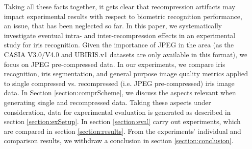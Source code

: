 \documentclass[10pt,twocolumn,letterpaper]{article}
\begin{document}
	Taking all these facts together, it gets clear that recompression artifacts may impact experimental results with respect to biometric recognition
	performance, an issue, that has been neglected so far. In this paper, we systematically investigate eventual intra- and inter-recompression effects 
	in an experimental study
	for iris recognition. Given the importance of JPEG in the area (as the CASIA V3.0/V4.0 and UBIRIS.v1 datasets are only available in this format), we 
	focus on JPEG pre-compressed data. In our experiments, we compare iris recognition, iris segmentation, and general purpose image quality metrics applied
	to single compressed vs. recompressed (i.e. JPEG pre-compressed) iris image data. In Section \ref{section:comprScheme}, we discuss the aspects relevant when generating single and recompressed data. Taking these aspects under consideration, data for experimental evaluation is generated as described in section \ref{section:exSetup}. In section \ref{section:eval} carry out experiments, which are compared in section \ref{section:results}. From the experiments' individual and comparison results, we withdraw a conclusion in section \ref{section:conclusion}.
	
\end{document}
